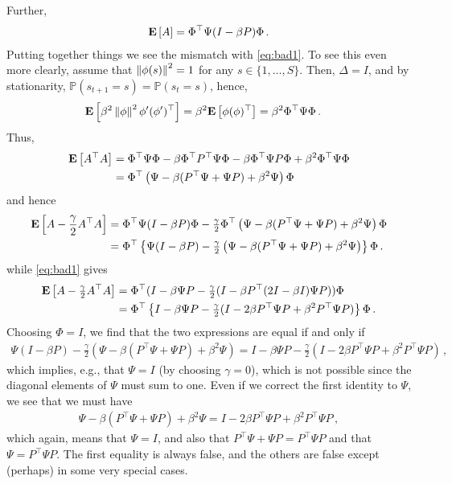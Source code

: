 \documentclass{article}
\newcommand{\Prob}[1]{\mathbb{P}\left(#1\right)}
\begin{document}
Further,
\begin{align*}
\mathbf{E}\left[ A \right]  = \Phi^\top  \Psi (I - \beta P) \Phi\,.
\end{align*}
Putting together things we see the mismatch with \eqref{eq:bad1}.
To see this even more clearly, assume that $ \left\| \phi(s)\right\|^2 = 1$ for any $s\in \{1,\dots,S\}$.
Then, $\Delta = I$, and by stationarity, $\Prob{s_{t+1} = s } = \Prob{s_t=s}$, hence,
\begin{align*}
\mathbf{E}\left[ \beta^2  \left\| \phi\right\|^2 \phi' (\phi')^\top \right] & =
\beta^2 \mathbf{E}\left[ \phi (\phi)^\top \right] =\beta^2 \Phi^\top \Psi \Phi\, .
\end{align*}
Thus, 
\begin{align*}
\mathbf{E}\left[ A^\top A \right] & = 
\Phi^\top  \Psi \Phi -  \beta \Phi^\top P^\top  \Psi \Phi - \beta \Phi^\top  \Psi P \Phi + \beta^2 \Phi^\top \Psi \Phi \\
& = 
\Phi^\top  \left(\Psi -  \beta  (P^\top  \Psi +   \Psi P) + \beta^2 \Psi \right) \Phi \\
\end{align*}
and hence
\begin{align*}
\mathbf{E}\left[ A - \frac{\gamma}{2} A^\top A \right] & = 
 \Phi^\top \Psi(I - \beta P) \Phi - \tfrac{\gamma}{2} 
 \Phi^\top  \left(\Psi -  \beta  (P^\top  \Psi +   \Psi P) + \beta^2 \Psi \right) \Phi \\
& = 
\Phi^\top  \left\{ \Psi (I - \beta P)- \tfrac{\gamma}{2} 
\left(\Psi -  \beta  (P^\top  \Psi +   \Psi P) + \beta^2 \Psi \right) \right\} \Phi \,.
\end{align*}
while \eqref{eq:bad1} gives
\begin{align*}
\mathbf{E}\left[ A - \tfrac{\gamma}{2} A^\top A  \right] 
& = \Phi^\top (I - \beta \Psi P - \tfrac{\gamma}{2}(I - \beta P^\top (2I - \beta I)\Psi P) ) \Phi \\
& = \Phi^\top \left\{I - \beta \Psi P - \tfrac{\gamma}{2}(I - 2 \beta P^\top\Psi P  +  \beta^2 P^\top \Psi P) \right\} \Phi\,.
\end{align*}
Choosing $\Phi = I$, we find that the two expressions are equal if and only if
\begin{align*}
 \Psi (I - \beta P)- \tfrac{\gamma}{2} \left( \Psi -  \beta  (P^\top  \Psi +   \Psi P) + \beta^2 \Psi \right)
= 
I - \beta \Psi P - \tfrac{\gamma}{2}(I - 2 \beta P^\top\Psi P  +  \beta^2 P^\top \Psi P)\,,
\end{align*}
which implies, e.g., that $\Psi=I$ (by choosing $\gamma=0$), which is not possible since the diagonal elements of $\Psi$ must sum to one.
Even if we correct the first identity to $\Psi$, we see that we must have
\begin{align*}
 \Psi -  \beta  (P^\top  \Psi +   \Psi P) + \beta^2 \Psi 
 = I - 2 \beta P^\top\Psi P  +  \beta^2 P^\top \Psi P\,,
\end{align*}
which again, means that $\Psi = I$, and also that $P^\top \Psi + \Psi P = P^\top \Psi P$ and that $\Psi = P^\top \Psi P$.
The first equality is always false, and the others are false except (perhaps) in some very special cases.
\end{document}
